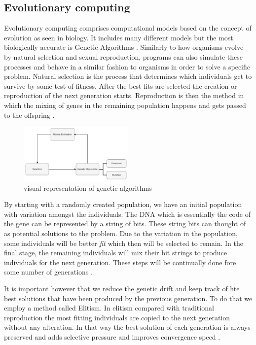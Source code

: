 \subsection{Evolutionary computing}
Evolutionary computing comprises computational models based on the concept of evolution as seen in biology. It includes many different models but the most biologically accurate is Genetic Algorithms \cite{drugan2019reinforcement} . Similarly to how organisms evolve by natural selection and sexual reproduction, programs can also simulate these processes and behave in a similar fashion to organisms in order to solve a specific problem. Natural selection is the process that determines which individuals get to survive by some test of fitness. After the best fits are selected the creation or reproduction of the next generation starts. Reproduction is then the method in which the mixing of genes in the remaining population happens and gets passed to the offspring \cite{holland1992genetic}.
\begin{figure}[H]
    \centering
    \includegraphics [width=0.5\textwidth]{Images/GA_graph.png}
    \caption{visual representation of genetic algorithms}
    \label{figGA}
\end{figure}

By starting with a randomly created population, we have an initial population with variation amongst the individuals. The DNA which is essentially the code of the gene can be represented by a string of bits. These string bits can thought of as potential solutions to the problem. Due to the variation in the population, some individuals will be better \textit{fit} which then will be selected to remain. In the final stage, the remaining individuals will mix their bit strings to produce individuals for the next generation. These steps will be continually done fore some number of generations \cite{forrest1996genetic}. 

It is important however that we reduce the genetic drift and keep track of hte best solutions that have been produced by the previous generation. To do that we employ a method called Elitism. In elitism compared with traditional reproduction the most fitting individuals are copied to the next generation without any alteration. In that way the best solution of each generation is always preserved and adds selective pressure and improves convergence speed \cite{du2018elitism}.

